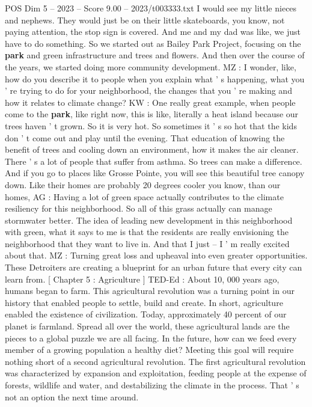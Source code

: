 \begin{textsample}{POS Dim 5 – 2023 – Score 9.00 – 2023/t003333.txt}
I would see my little nieces and nephews.
They would just be on their little skateboards, you know, not paying attention, the stop sign is covered.
And me and my dad was like, we just have to do something.
So we started out as Bailey Park Project, focusing on the \textbf{park} and green infrastructure and trees and flowers.
And then over the course of the years, we started doing more community development.
MZ : I wonder, like, how do you describe it to people when you explain what ' s happening, what you ' re trying to do for your neighborhood, the changes that you ' re making and how it relates to climate change?
KW : One really great example, when people come to the \textbf{park}, like right now, this is like, literally a heat island because our trees haven ' t grown.
So it is very hot.
So sometimes it ' s so hot that the kids don ' t come out and play until the evening.
That education of knowing the benefit of trees and cooling down an environment, how it makes the air cleaner.
There ' s a lot of people that suffer from asthma.
So trees can make a difference.
And if you go to places like Grosse Pointe, you will see this beautiful tree canopy down.
Like their homes are probably 20 degrees cooler you know, than our homes, AG : Having a lot of green space actually contributes to the climate resiliency for this neighborhood.
So all of this grass actually can manage stormwater better.
The idea of leading new development in this neighborhood with green, what it says to me is that the residents are really envisioning the neighborhood that they want to live in.
And that I just -- I ' m really excited about that.
MZ : Turning great loss and upheaval into even greater opportunities.
These Detroiters are creating a blueprint for an urban future that every city can learn from. [ Chapter 5 : Agriculture ] TED-Ed : About 10, 000 years ago, humans began to farm.
This agricultural revolution was a turning point in our history that enabled people to settle, build and create.
In short, agriculture enabled the existence of civilization.
Today, approximately 40 percent of our planet is farmland.
Spread all over the world, these agricultural lands are the pieces to a global puzzle we are all facing.
In the future, how can we feed every member of a growing population a healthy diet?
Meeting this goal will require nothing short of a second agricultural revolution.
The first agricultural revolution was characterized by expansion and exploitation, feeding people at the expense of forests, wildlife and water, and destabilizing the climate in the process.
That ' s not an option the next time around.

\end{textsample}
